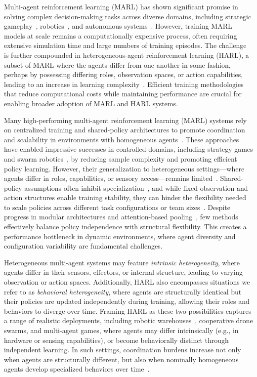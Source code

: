 \documentclass{article}
\begin{document}
Multi-agent reinforcement learning (MARL) has shown significant promise in solving complex 
decision-making tasks across diverse domains, including 
strategic gameplay~\cite{silver2016, vinyals2019, berner2019}, 
robotics~\cite{rizk2019, liang2024}, 
and autonomous systems~\cite{abeywickrama2022}. 
However, training MARL models at scale remains a computationally expensive process, 
often requiring extensive simulation time and large numbers of training episodes. 
The challenge is further compounded in heterogeneous-agent reinforcement learning (HARL), 
a subset of MARL where the agents 
differ from one another in some fashion, perhaps by possessing 
differing roles, observation spaces, 
or action capabilities, leading to an increase in learning complexity~\cite{rizk2019, yang2021a}.
Efficient training methodologies that reduce computational costs while maintaining 
performance are crucial for enabling broader adoption of MARL and HARL systems.

Many high-performing multi-agent reinforcement learning (MARL) systems rely on 
centralized training and shared-policy architectures to promote coordination and scalability 
in environments with homogeneous agents~\cite{ackermann2019,zhou2023}.
These approaches have enabled impressive successes in controlled domains, 
including strategy games and swarm robotics~\cite{vinyals2019, hoang2023}, 
by reducing sample complexity and promoting efficient policy learning. However, their 
generalization to heterogeneous settings—where agents differ in roles, capabilities, or 
sensory access—remains limited~\cite{zhong2024}. 
Shared-policy assumptions often inhibit specialization~\cite{smit2023}, 
and while fixed observation and action structures enable training stability, 
they can hinder the flexibility needed to scale policies across different 
task configurations or team sizes~\cite{papoudakis2021}. Despite progress 
in modular architectures and attention-based pooling~\cite{iqbal2021, foerster2017}, 
few methods effectively balance policy independence with structural flexibility. 
This creates a performance bottleneck in dynamic environments, where agent diversity and 
configuration variability are fundamental challenges.

Heterogeneous multi-agent systems may feature \emph{intrinsic heterogeneity}, 
where agents differ in their sensors, effectors, or internal structure, 
leading to varying observation or action spaces. Additionally, 
HARL also encompasses situations we refer to as \emph{behavioral heterogeneity}, 
where agents are structurally identical but their policies are updated independently 
during training, allowing their roles and behaviors to diverge over time. 
Framing HARL as these two possibilities captures a range of realistic deployments, including 
robotic warehouses~\cite{rizk2019}, cooperative drone swarms, and multi-agent games, where 
agents may differ intrinsically (e.g., in hardware or sensing capabilities), 
or become behaviorally distinct through independent learning. In such settings, 
coordination burdens increase not only when agents are structurally different, 
but also when nominally homogeneous agents develop specialized behaviors over 
time~\cite{shoham2007,ackermann2019}.
\end{document}
